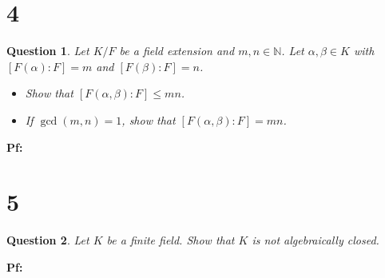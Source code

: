 \documentclass{article}
\newtheorem{question}{Question}
\begin{document}
\section*{4}
\begin{myBox}[]{}
    \begin{question}
        Let $K/F$ be a field extension and $m,n\in\mathbb{N}$. Let $\alpha,\beta\in K$ with $[F(\alpha):F]=m$ and $[F(\beta):F]=n$.
        \begin{itemize}
            \item[(a)] Show that $[F(\alpha,\beta):F]\leq mn$.
            \item[(b)] If $\gcd(m,n)=1$, show that $[F(\alpha,\beta):F]=mn$.
        \end{itemize}
    \end{question}
\end{myBox}

\textbf{Pf:}

\break

\section*{5}
\begin{myBox}[]{}
    \begin{question}
        Let $K$ be a finite field. Show that $K$ is not algebraically closed.
    \end{question}
\end{myBox}

\textbf{Pf:}
\end{document}
